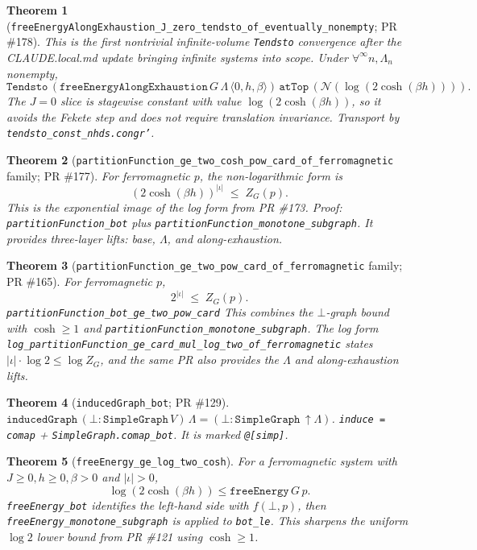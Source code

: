 \documentclass[a4paper,11pt]{article}
\newtheorem{theorem}{Theorem}
\begin{document}
\begin{theorem}[\texttt{freeEnergyAlongExhaustion\_J\_zero\_tendsto\_of\_eventually\_nonempty}; PR \#178]
This is the first nontrivial infinite-volume \texttt{Tendsto} convergence
after the CLAUDE.local.md update bringing infinite systems into scope. Under
$\forall^\infty n, \Lambda_n$ nonempty,
\[
  \texttt{Tendsto}\,(\texttt{freeEnergyAlongExhaustion}\,G\,\Lambda\,\langle 0, h, \beta\rangle)\,
    \texttt{atTop}\,(\mathcal N(\log(2 \cosh(\beta h)))).
\]
The $J = 0$ slice is stagewise constant with value
$\log(2 \cosh(\beta h))$, so it avoids the Fekete step and does not require
translation invariance. Transport by \texttt{tendsto\_const\_nhds.congr'}.
\end{theorem}

\begin{theorem}[\texttt{partitionFunction\_ge\_two\_cosh\_pow\_card\_of\_ferromagnetic} family; PR \#177]
For ferromagnetic $p$, the non-logarithmic form is
\[
  (2 \cosh(\beta h))^{|\iota|} \;\le\; Z_G(p).
\]
This is the exponential image of the log form from PR \#173. Proof:
\texttt{partitionFunction\_bot} plus
\texttt{partitionFunction\_monotone\_subgraph}. It provides three-layer
lifts: base, $\Lambda$, and along-exhaustion.
\end{theorem}

\begin{theorem}[\texttt{partitionFunction\_ge\_two\_pow\_card\_of\_ferromagnetic} family; PR \#165]
For ferromagnetic $p$,
\[
  2^{|\iota|} \;\le\; Z_G(p).
\]
\texttt{partitionFunction\_bot\_ge\_two\_pow\_card}
This combines the $\bot$-graph bound with $\cosh \ge 1$ and
\texttt{partitionFunction\_monotone\_subgraph}. The log form
\texttt{log\_partitionFunction\_ge\_card\_mul\_log\_two\_of\_ferromagnetic}
states $|\iota| \cdot \log 2 \le \log Z_G$, and the same PR also provides
the $\Lambda$ and along-exhaustion lifts.
\end{theorem}

\begin{theorem}[\texttt{inducedGraph\_bot}; PR \#129]
$\texttt{inducedGraph}\,(\bot : \texttt{SimpleGraph}\,V)\,\Lambda
  = (\bot : \texttt{SimpleGraph}\,\uparrow\Lambda)$.
\texttt{induce = comap} + \texttt{SimpleGraph.comap\_bot}.
It is marked \texttt{@[simp]}.
\end{theorem}

\begin{theorem}[\texttt{freeEnergy\_ge\_log\_two\_cosh}]
For a ferromagnetic system with $J \ge 0, h \ge 0, \beta > 0$ and
$|\iota| > 0$,
\[
  \log(2 \cosh(\beta h)) \le \texttt{freeEnergy}\,G\,p.
\]
\texttt{freeEnergy\_bot} identifies the left-hand side with $f(\bot, p)$,
then \texttt{freeEnergy\_monotone\_subgraph} is applied to \texttt{bot\_le}.
This sharpens the uniform $\log 2$ lower bound from PR \#121 using
$\cosh \ge 1$.
\end{theorem}
\end{document}
